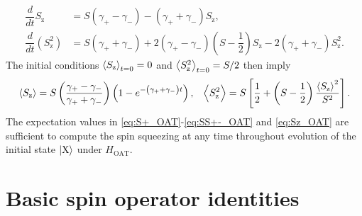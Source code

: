 \documentclass[aps,11pt,notitlepage,nofootinbib,longbibliography]{revtex4-1}
\renewcommand{\t}{\text} %
\newcommand{\f}[2]{\dfrac{#1}{#2}} %
\newcommand{\p}[1]{\left(#1\right)} %
\renewcommand{\sp}[1]{\left[#1\right]} %
\newcommand{\bk}{\Braket} %
\newcommand{\z}{\text{z}}
\newcommand{\X}{\text{X}}
\newcommand{\1}{\mathds{1}}
\begin{document}
\begin{align}
  \f{d}{dt} S_\z
  &= S\p{\gamma_+-\gamma_-} - \p{\gamma_++\gamma_-} S_\z,
  \\
  \f{d}{dt}\p{S_\z^2}
  &= S\p{\gamma_++\gamma_-} + 2\p{\gamma_+-\gamma_-}\p{S-\f12} S_\z
  - 2 \p{\gamma_++\gamma_-} S_\z^2.
\end{align}
The initial conditions $\bk{S_\z}_{t=0}=0$ and $\bk{S_\z^2}_{t=0}=S/2$
then imply
\begin{align}
  \bk{S_\z}
  = S\p{\f{\gamma_+-\gamma_-}{\gamma_++\gamma_-}}
  \p{1-e^{-\p{\gamma_+ + \gamma_-} t}},
  &&
  \bk{S_\z^2} = S \sp{\f12 + \p{S-\f12} \f{\bk{S_\z}^2}{S^2}}.
  \label{eq:Sz_OAT}
\end{align}
The expectation values in \eqref{eq:S+_OAT}-\eqref{eq:SS+-_OAT} and
\eqref{eq:Sz_OAT} are sufficient to compute the spin squeezing at any
time throughout evolution of the initial state $\ket{\X}$ under
$H_{\t{OAT}}$.


\section{Basic spin operator identities}
\label{sec:identities}
\end{document}
